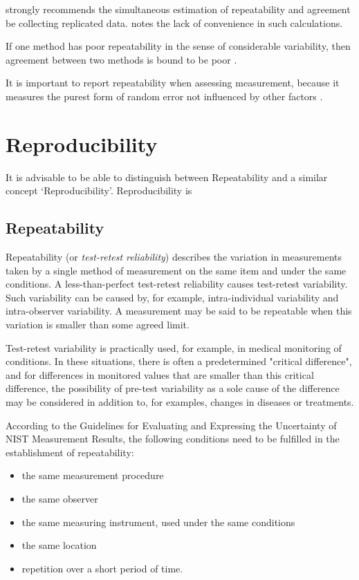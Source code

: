 \documentclass[12pt, a4paper]{article}
\begin{document}
	
	
	\citet{BA99} strongly recommends the simultaneous estimation of 	repeatability and agreement be collecting replicated data. 	\citet{ARoy2009} notes the lack of convenience in such
	calculations.
	
	
	If one method has poor repeatability in the sense of considerable
	variability, then agreement between two methods is bound to be
	poor \citep{ARoy2009}.
	
	It is important to report repeatability when assessing
	measurement, because it measures the purest form of random error
	not influenced by other factors \citep{Barnhart}.
	
\section{Reproducibility}
 
It is advisable to be able to distinguish between Repeatability and a similar concept ‘Reproducibility’. Reproducibility is


\newpage



\subsection{Repeatability}
Repeatability (or \textit{test-retest reliability})  describes the variation in measurements taken by a single method of measurement on the same item and under the same conditions. 
A less-than-perfect test-retest reliability causes test-retest variability. Such variability can be caused by, for example, intra-individual variability and intra-observer variability. 
A measurement may be said to be repeatable when this variation is smaller than some agreed limit.

Test-retest variability is practically used, for example, in medical monitoring of conditions. In these situations, there is often a predetermined "critical difference", and for differences in monitored values that are smaller than this critical difference, the possibility of pre-test variability as a sole cause of the difference may be considered in addition to, for examples, changes in diseases or treatments.

According to the Guidelines for Evaluating and Expressing the Uncertainty of NIST Measurement Results, the following conditions need to be fulfilled in the establishment of repeatability:
\begin{itemize}
	\item	the same measurement procedure
	\item	the same observer
	\item	the same measuring instrument, used under the same conditions
	\item	the same location
	\item	repetition over a short period of time.
\end{itemize}
\newpage
\end{document}
